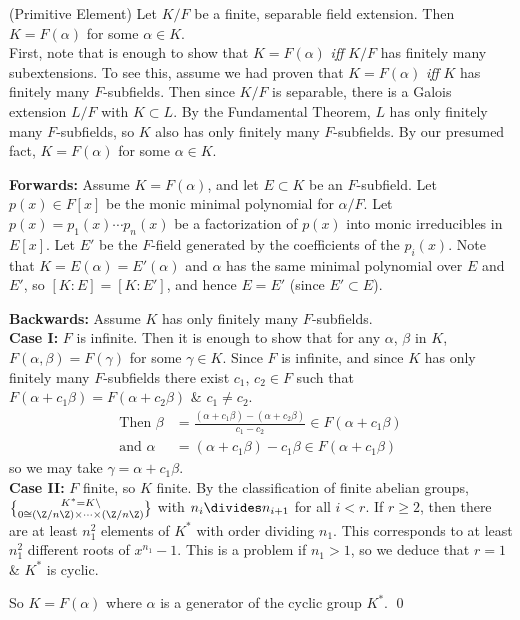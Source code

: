 \thm (Primitive Element) Let $K/F$ be a finite, separable field extension.  Then $K=F(\alpha)$ for some $\alpha\in K$. \\
\pf First, note that is enough to show that $K=F(\alpha)$ \emph{iff} $K/F$ has finitely many subextensions.  To see this, assume we had proven that $K=F(\alpha)$ \emph{iff} $K$ has finitely many $F$-subfields.  Then since $K/F$ is separable, there is a Galois extension $L/F$ with $K\subset L$.  By the Fundamental Theorem, $L$ has only finitely many $F$-subfields, so $K$ also has only finitely many $F$-subfields.  By our presumed fact, $K=F(\alpha)$ for some $\alpha\in K$.

\textbf{Forwards: }Assume $K=F(\alpha)$, and let $E\subset K$ be an $F$-subfield.  Let $p(x)\in F[x]$ be the monic minimal polynomial for $\alpha/F$.  Let $p(x)=p_1(x)\dotsm p_n(x)$ be a factorization of $p(x)$ into monic irreducibles in $E[x]$.  Let $E'$ be the $F$-field generated by the coefficients of the $p_i(x)$.  Note that $K=E(\alpha)=E'(\alpha)$ and $\alpha$ has the same minimal polynomial over $E$ and $E'$, so $[K:E]=[K:E']$, and hence $E=E'$ (since $E'\subset E$).

\textbf{Backwards: }Assume $K$ has only finitely many $F$-subfields. \\
\textbf{Case I: }$F$ is infinite.  Then it is enough to show that for any $\alpha$, $\beta$ in $K$, $F(\alpha,\beta)=F(\gamma)$ for some $\gamma\in K$.  Since $F$ is infinite, and since $K$ has only finitely many $F$-subfields there exist $c_1$, $c_2\in F$ such that $F(\alpha+c_1\beta)=F(\alpha+c_2\beta)$ \& $c_1\neq c_2$.  
\begin{align*}
\text{Then } \beta &= \frac{(\alpha+c_1\beta)-(\alpha+c_2\beta)}{c_1-c_2}\in F(\alpha+c_1\beta) \\
\text{and } \alpha &= (\alpha+c_1\beta)-c_1\beta \in F(\alpha+c_1\beta)
\end{align*}
so we may take $\gamma=\alpha+c_1\beta$. \\
\textbf{Case II: }$F$ finite, so $K$ finite.  By the classification of finite abelian groups, $K^*=K\setminus\brace0\cong(\Z/n\Z)\times\dotsb\times(\Z/n\Z)$ with $n_i\divides n_{i+1}$ for all $i<r$.  If $r\geq2$, then there are at least $n_1^2$ elements of $K^*$ with order dividing $n_1$.  This corresponds to at least $n_1^2$ different roots of $x^{n_1}-1$.  This is a problem if $n_1>1$, so we deduce that $r=1$ \& $K^*$ is cyclic.

So $K=F(\alpha)$ where $\alpha$ is a generator of the cyclic group $K^*$. \qed

